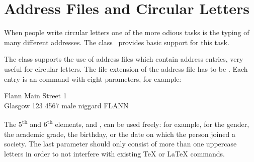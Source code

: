 %
%
%
%
%
%


\section{Address Files and Circular Letters}
\label{sec:scrlttr2.addressFile}%
%
%
%

When people write circular letters one of the more odious tasks is the typing
of many different addresses.  The class %
\iffalse%
, as did its predecessor \Class{scrlettr} as well,%
\fi%
\ provides basic support for this task.%
\iffalse%
\ Currently there are plans for much enhanced support.%
\fi

\begin{Declaration}
\end{Declaration}%
%
The class  supports the use of address files which
contain address entries, very useful for circular letters. The file
extension of the address file has to be . Each entry is an
 command with eight parameters, for example:
\begin{lstcode}
           {Flann}
           {Main Street 1\\ Glasgow}
           {123 4567}
           {male}
           {}
           {niggard}
           {FLANN}
\end{lstcode}
The 5\textsuperscript{th} and 6\textsuperscript{th} elements,  and
, can be used freely: for example, for the gender, the academic
grade, the birthday, or the date on which the person joined a society.  The
last parameter  should only consist of more than one uppercase
letters in order to not interfere with existing {\TeX} or {\LaTeX} commands.

